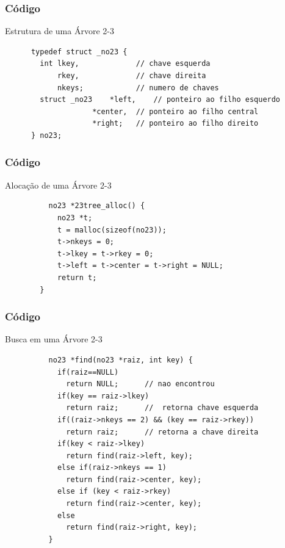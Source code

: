 \documentclass[cyan,compress,aspectratio=43]{beamer}
\begin{document}

\begin{frame}[fragile]
\frametitle{Código}
  \vspace{-0.3cm}
  \begin{block}{Estrutura de uma Árvore 2-3}
    \begin{lstlisting}
	  typedef struct _no23 {
	    int	lkey,             // chave esquerda
		    rkey,             // chave direita
		    nkeys;            // numero de chaves
	    struct _no23	*left,    // ponteiro ao filho esquerdo
				    *center,  // ponteiro ao filho central
				    *right;   // ponteiro ao filho direito
	  } no23;
    \end{lstlisting}
  \end{block}
\end{frame}

\begin{frame}[fragile]
\frametitle{Código}
      \vspace{-0.3cm}
	\begin{block}{Alocação de uma Árvore 2-3}
		\begin{lstlisting}
		  no23 *23tree_alloc() {
		    no23 *t;
		    t = malloc(sizeof(no23));
		    t->nkeys = 0;
		    t->lkey = t->rkey = 0;
		    t->left = t->center = t->right = NULL;
		    return t;
		}
		\end{lstlisting}

  	\end{block}
\end{frame}
\begin{frame}[fragile]
\frametitle{Código}
      \vspace{-0.3cm}
	\begin{block}{Busca em uma Árvore 2-3}
		\begin{lstlisting}
		  no23 *find(no23 *raiz, int key) {
		    if(raiz==NULL)
		      return NULL;      // nao encontrou
		    if(key == raiz->lkey)
		      return raiz;      //  retorna chave esquerda
		    if((raiz->nkeys == 2) && (key == raiz->rkey))
		      return raiz;      // retorna a chave direita
		    if(key < raiz->lkey)
		      return find(raiz->left, key);
		    else if(raiz->nkeys == 1)
		      return find(raiz->center, key);
		    else if (key < raiz->rkey)
		      return find(raiz->center, key);
		    else
		      return find(raiz->right, key);
		  }
		\end{lstlisting}

  	\end{block}
\end{frame}
\end{document}
